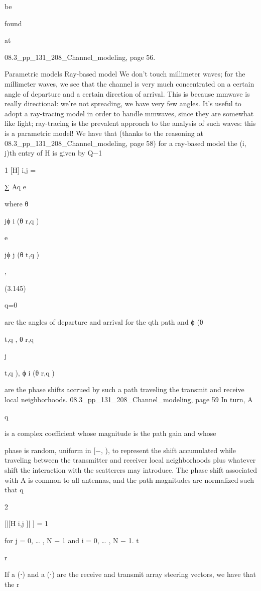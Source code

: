 {{{{be

found

at

08.3_pp_131_208_Channel_modeling, page 56.

Parametric models Ray-based model We don't touch millimeter waves; for the millimeter waves, we see that the channel is very much concentrated on a certain angle of departure and a certain direction of arrival.
This is because mmwave is really directional: we're not spreading, we have very few angles.
It's useful to adopt a ray-tracing model in order to handle mmwaves, since they are somewhat like light; ray-tracing is the prevalent approach to the analysis of such waves: this is a parametric model!
We have that (thanks to the reasoning at 08.3_pp_131_208_Channel_modeling, page 58)
for a ray-based model the (i, j)th entry of H is given by Q−1

1
[H] i,j =

∑ Aq e
\sqrtQ

where θ

jϕ i (θ r,q )

e

jϕ j (θ t,q )

,

(3.145)

q=0

are the angles of departure and arrival for the qth path and ϕ (θ

t,q , θ r,q

j

t,q ), ϕ i (θ r,q )

are the phase shifts accrued by such a path traveling the transmit and receive local neighborhoods.
08.3_pp_131_208_Channel_modeling, page 59 In turn, A

q

is a complex coefficient whose magnitude is the path gain and whose

phase is random, uniform in [−\pi, \pi), to represent the shift accumulated while traveling between the transmitter and receiver local neighborhoods plus whatever shift the interaction with the scatterers may introduce. The phase shift associated with A is common to all antennas, and the path magnitudes are normalized such that q

2

[|[H i,j ]| ] = 1

for j = 0, … , N − 1 and i = 0, … , N − 1.
t

r

If a (⋅) and a (⋅) are the receive and transmit array steering vectors, we have that the r

}}}}
